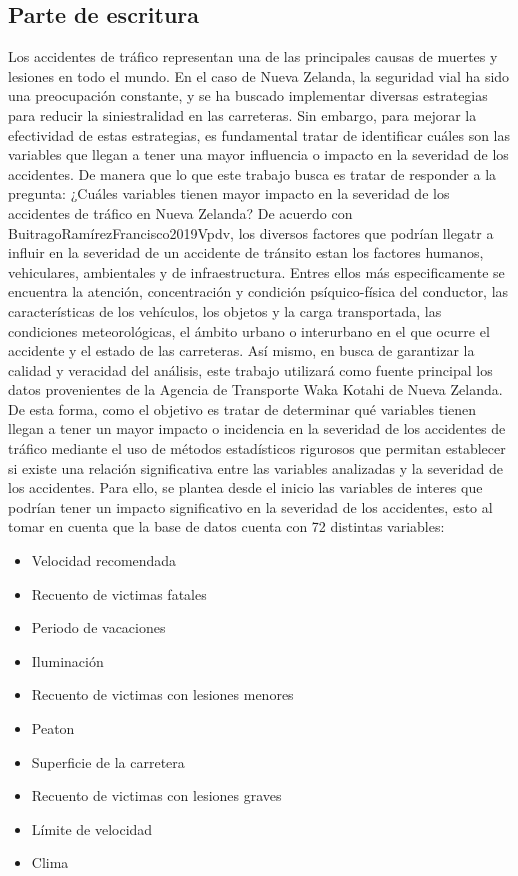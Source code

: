 \documentclass{book}
\begin{document}
\subsection{Parte de escritura}
Los accidentes de tráfico representan una de las principales causas de muertes y lesiones en todo el mundo. En el caso de Nueva Zelanda, la seguridad vial ha sido una preocupación constante, y se ha buscado implementar diversas estrategias para reducir la siniestralidad en las carreteras. Sin embargo, para mejorar la efectividad de estas estrategias, es fundamental tratar de identificar cuáles son las variables que llegan a tener una mayor influencia o impacto en la severidad de los accidentes. De manera que lo que este trabajo busca es tratar de responder a la pregunta: ¿Cuáles variables tienen mayor impacto en la severidad de los accidentes de tráfico en Nueva Zelanda?
De acuerdo con {BuitragoRamírezFrancisco2019Vpdv}, los diversos factores que podrían llegatr a influir en la severidad de un accidente de tránsito estan los factores humanos, vehiculares, ambientales y de infraestructura. Entres ellos más especificamente se encuentra la atención, concentración y condición psíquico-física del conductor, las características de los vehículos, los objetos y la carga transportada, las condiciones meteorológicas, el ámbito urbano o interurbano en el que ocurre el accidente y el estado de las carreteras.
Así mismo, en busca de garantizar la calidad y veracidad del análisis, este trabajo utilizará como fuente principal los datos provenientes de la Agencia de Transporte Waka Kotahi de Nueva Zelanda. De esta forma, como el objetivo es tratar de determinar qué variables tienen llegan a tener un mayor impacto o incidencia en la severidad de los accidentes de tráfico mediante el uso de métodos estadísticos rigurosos que permitan establecer si existe una relación significativa entre las variables analizadas y la severidad de los accidentes.
Para ello, se plantea desde el inicio las variables de interes que podrían tener un impacto significativo en la severidad de los accidentes, esto al tomar en cuenta que la base de datos cuenta con 72 distintas variables:
\begin{itemize}
    \item Velocidad recomendada
    \item Recuento de victimas fatales
    \item Periodo de vacaciones
    \item Iluminación
    \item Recuento de victimas con lesiones menores
    \item Peaton
    \item Superficie de la carretera
    \item Recuento de victimas con lesiones graves
    \item Límite de velocidad
    \item Clima
\end{itemize}
\end{document}
